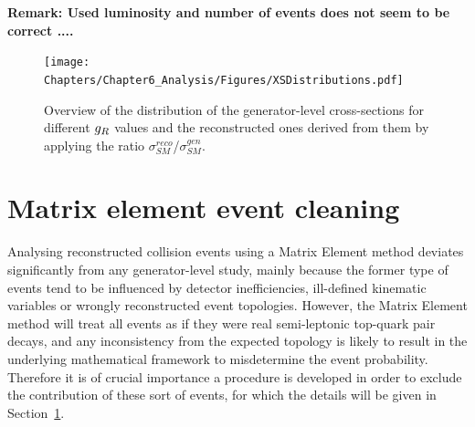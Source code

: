 \textbf{Remark: Used luminosity and number of events does not seem to be correct ....}

\begin{figure}[h!t]
 \centering
 \texttt{[image: Chapters/Chapter6\_Analysis/Figures/XSDistributions.pdf]}
 \caption{Overview of the distribution of the generator-level cross-sections for different $g_{R}$ values and the reconstructed ones derived from them by applying the ratio $\sigma_{SM}^{reco}$/$\sigma_{SM}^{gen}$.} \label{fig::XSDistr}
\end{figure}

\section{Matrix element event cleaning} \label{subsec::EvtCleaning}
Analysing reconstructed collision events using a Matrix Element method deviates significantly from any generator-level study, mainly because the former type of events tend to be influenced by detector inefficiencies, ill-defined kinematic variables or wrongly reconstructed event topologies. However, the Matrix Element method will treat all events as if they were real semi-leptonic top-quark pair decays, and any inconsistency from the expected topology is likely to result in the underlying mathematical framework to misdetermine the event probability.
Therefore it is of crucial importance a procedure is developed in order to exclude the contribution of these sort of events, for which the details will be given in Section~\ref{subsec::EvtCleaning}.
\\

